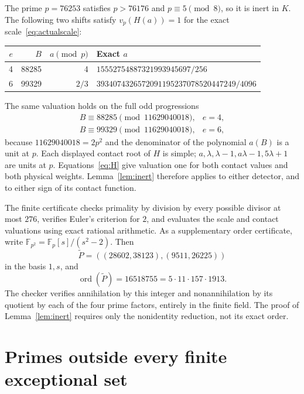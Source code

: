 \documentclass[11pt,a4paper]{article}
\begin{document}
The prime $p=76253$ satisfies $p>76176$ and $p\equiv5\pmod8$,
so it is inert in $K$. The following two shifts satisfy
$v_p(H(a))=1$ for the exact scale~\eqref{eq:actualscale}:
\begin{center}
\begin{tabular}{rrrl}\toprule
$e$&$B$&$a\pmod p$&Exact $a$\\\midrule
4&88285&4&$15552754887321993945697/256$\\
6&99329&$2/3$&$3934074326572091195237078520447249/4096$\\\bottomrule
\end{tabular}
\end{center}
The same valuation holds on the full odd progressions
\begin{equation}\label{eq:progressions}
 \begin{array}{ll}
 B\equiv88285\pmod{11629040018},&e=4,\\
 B\equiv99329\pmod{11629040018},&e=6,
 \end{array}
\end{equation}
because $11629040018=2p^2$ and the denominator of the polynomial
$a(B)$ is a unit at $p$. Each displayed contact root of $H$ is simple;
$a,\lambda,\lambda-1,a\lambda-1,5\lambda+1$ are units at $p$.
Equations~\eqref{eq:H} give valuation one for both contact values and
both physical weights. Lemma~\ref{lem:inert} therefore applies to
either detector, and to either sign of its contact function.

The finite certificate checks primality by division by every possible
divisor at most $276$, verifies Euler's criterion for $2$, and evaluates
the scale and contact valuations using exact rational arithmetic.
As a supplementary order certificate, write
$\mathbb F_{p^2}=\mathbb F_p[s]/(s^2-2)$. Then
\[
 \widetilde P=((28602,38123),(9511,26225))
\]
in the basis $1,s$, and
\[
 \operatorname{ord}(\widetilde P)=16518755=5\cdot11\cdot157\cdot1913.
\]
The checker verifies annihilation by this integer and nonannihilation
by its quotient by each of the four prime factors, entirely in the
finite field. The proof of Lemma~\ref{lem:inert} requires only the
nonidentity reduction, not its exact order.

\section{Primes outside every finite exceptional set}
\end{document}
